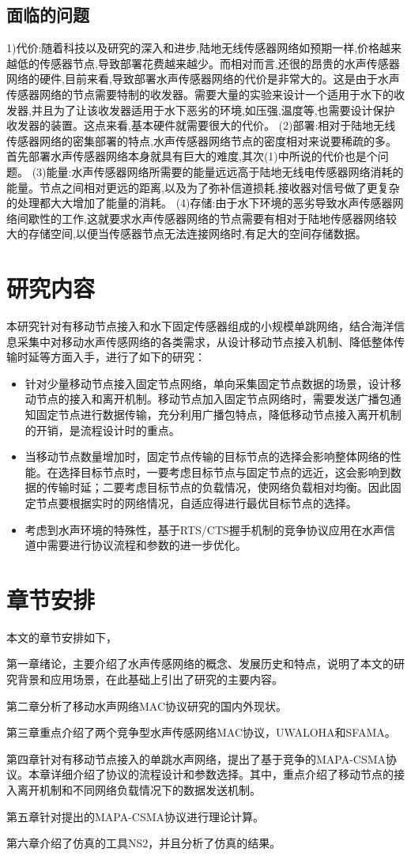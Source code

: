 \subsection{面临的问题}
1)代价:随着科技以及研究的深入和进步,陆地无线传感器网络如预期一样,价格越来越低的传感器节点,导致部署花费越来越少。而相对而言,还很的昂贵的水声传感器网络的硬件,目前来看,导致部署水声传感器网络的代价是非常大的。这是由于水声传感器网络的节点需要特制的收发器。需要大量的实验来设计一个适用于水下的收发器,并且为了让该收发器适用于水下恶劣的环境,如压强,温度等,也需要设计保护收发器的装置。这点来看,基本硬件就需要很大的代价。
(2)部署:相对于陆地无线传感器网络的密集部署的特点,水声传感器网络节点的密度相对来说要稀疏的多。首先部署水声传感器网络本身就具有巨大的难度,其次(1)中所说的代价也是个问题。
(3)能量:水声传感器网络所需要的能量远远高于陆地无线电传感器网络消耗的能量。节点之间相对更远的距离,以及为了弥补信道损耗,接收器对信号做了更复杂的处理都大大增加了能量的消耗。
(4)存储:由于水下环境的恶劣导致水声传感器网络间歇性的工作,这就要求水声传感器网络的节点需要有相对于陆地传感器网络较大的存储空间,以便当传感器节点无法连接网络时,有足大的空间存储数据。



\section{研究内容}
本研究针对有移动节点接入和水下固定传感器组成的小规模单跳网络，结合海洋信息采集中对移动水声传感网络的各类需求，从设计移动节点接入机制、降低整体传输时延等方面入手，进行了如下的研究：
\begin{itemize}
	\item 针对少量移动节点接入固定节点网络，单向采集固定节点数据的场景，设计移动节点的接入和离开机制。移动节点加入固定节点网络时，需要发送广播包通知固定节点进行数据传输，充分利用广播包特点，降低移动节点接入离开机制的开销，是流程设计时的重点。
	\item 当移动节点数量增加时，固定节点传输的目标节点的选择会影响整体网络的性能。在选择目标节点时，一要考虑目标节点与固定节点的远近，这会影响到数据的传输时延；二要考虑目标节点的负载情况，使网络负载相对均衡。因此固定节点要根据实时的网络情况，自适应得进行最优目标节点的选择。
	\item 考虑到水声环境的特殊性，基于RTS/CTS握手机制的竞争协议应用在水声信道中需要进行协议流程和参数的进一步优化。
\end{itemize}

\section{章节安排}
本文的章节安排如下，

第一章绪论，主要介绍了水声传感网络的概念、发展历史和特点，说明了本文的研究背景和应用场景，在此基础上引出了研究的主要内容。

第二章分析了移动水声网络MAC协议研究的国内外现状。

第三章重点介绍了两个竞争型水声传感网络MAC协议，UWALOHA和SFAMA。

第四章针对有移动节点接入的单跳水声网络，提出了基于竞争的MAPA-CSMA协议。本章详细介绍了协议的流程设计和参数选择。其中，重点介绍了移动节点的接入离开机制和不同网络负载情况下的数据发送机制。

第五章针对提出的MAPA-CSMA协议进行理论计算。

第六章介绍了仿真的工具NS2，并且分析了仿真的结果。

\endinput
